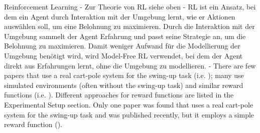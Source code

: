 Reinforcement Learning
- Zur Theorie von RL siehe oben
- RL ist ein Ansatz, bei dem ein Agent durch Interaktion mit der Umgebung lernt, wie er Aktionen auswählen soll, um eine Belohnung zu maximieren. Durch die Interaktion mit der Umgebung sammelt der Agent Erfahrung und passt seine Strategie an, um die Belohnung zu maximieren. Damit weniger Aufwand für die Modellierung der Umgebung benötigt wird, wird Model-Free RL verwendet, bei dem der Agent direkt aus Erfahrungen lernt, ohne die Umgebung zu modellieren.
- There are few papers that use a real cart-pole system for the swing-up task (i.e. \cite{nayante_reinforcement_2021,pilcolearner_cart-pole_2011,deisenroth_pilco_2011}); many use simulated environments (often without the swing-up task) and similar reward functions (i.e. \cite{kumar_balancing_2020,liu_swing-up_2023,kimura_stochastic_1999}). Different approaches for reward functions are listed in the Experimental Setup section. Only one paper was found that uses a real cart-pole system for the swing-up task and was published recently, but it employs a simple reward function (\cite{nayante_reinforcement_2021}).

